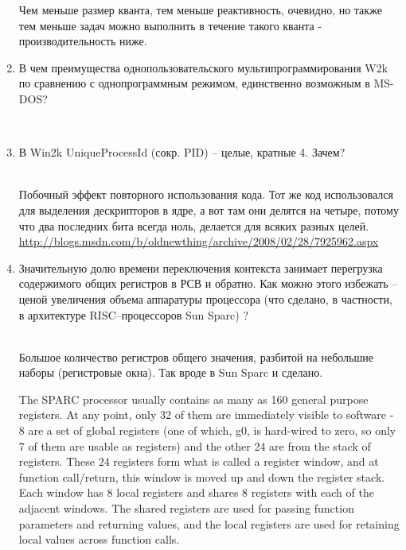 \documentclass[12pt, a4paper]{article}
\begin{document}
\begin{enumerate}
    Чем меньше размер кванта, тем меньше реактивность, очевидно, но также тем меньше задач можно выполнить в течение такого кванта - производительность 
    ниже.

  \item \begin{bf} В чем преимущества однопользовательского мультипрограммирования W2k по сравнению с однопрограммным режимом, единственно возможным в MS-DOS? \end{bf} \\

  \item \begin{bf}В Win2k UniqueProcessId (сокр. PID) – целые, кратные 4. Зачем?\end{bf} \\

    Побочный эффект повторного использования кода. Тот же код использовался для выделения дескрипторов в ядре, а вот там они делятся на четыре, потому что
    два последних бита всегда ноль, делается для всяких разных целей. \\ 
    \url{http://blogs.msdn.com/b/oldnewthing/archive/2008/02/28/7925962.aspx}

    \pagebreak

  \item \begin{bf} Значительную долю времени переключения контекста занимает перегрузка содержимого общих регистров в РСВ и обратно. Как можно этого избежать – ценой увеличения объема аппаратуры процессора (что сделано, в частности, в архитектуре RISC–процессоров Sun Sparc) ?\end{bf}\\

      Большое количество регистров общего значения, разбитой на небольшие наборы (регистровые окна). Так вроде в Sun Sparc и сделано.

      The SPARC processor usually contains as many as 160 general purpose registers. At any point, only 32 of them are immediately visible to software - 8 are a set of global registers (one of which, g0, is hard-wired to zero, so only 7 of them are usable as registers) and the other 24 are from the stack of registers. These 24 registers form what is called a register window, and at function call/return, this window is moved up and down the register stack. Each window has 8 local registers and shares 8 registers with each of the adjacent windows. The shared registers are used for passing function parameters and returning values, and the local registers are used for retaining local values across function calls.


\end{enumerate}
\end{document}
